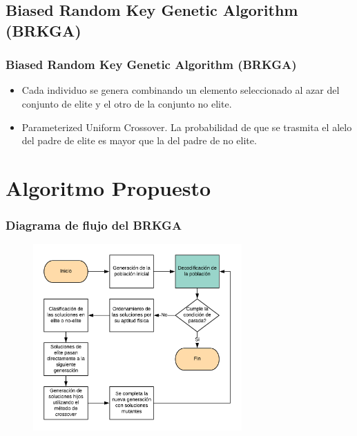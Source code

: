 \documentclass{beamer}
\begin{document}

\subsection{Biased Random Key Genetic Algorithm (BRKGA)}

\begin{frame}
\frametitle{Biased Random Key Genetic Algorithm (BRKGA)}

\begin{itemize}
    \item Cada individuo se genera combinando un elemento seleccionado al azar del conjunto de elite y el otro de la conjunto no elite.
    \pause
    \item Parameterized Uniform Crossover. La probabilidad de que se trasmita el alelo del padre de elite es mayor que la del padre de no elite.
\end{itemize}

\end{frame}


\section{Algoritmo Propuesto}

\begin{frame}
\frametitle{Diagrama de flujo del BRKGA}

\begin{figure}[h]
	\centering
	\includegraphics[width=8cm]{BRKGA_Flow_Chart_Base}
	\label{fig:BRKGA_Flow_Chart_Base}
\end{figure}

\end{frame}
\end{document}
